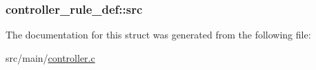 \hypertarget{structcontroller__rule__def_a3f15a42724fce9ddcb35e350b74358ab}{
\subsubsection[{src}]{ controller\+\_\+rule\+\_\+def\+::src}}\label{structcontroller__rule__def_a3f15a42724fce9ddcb35e350b74358ab}


The documentation for this struct was generated from the following file\+:\begin{DoxyCompactItemize}
\item 
src/main/\hyperlink{controller_8c}{controller.\+c}\end{DoxyCompactItemize}
